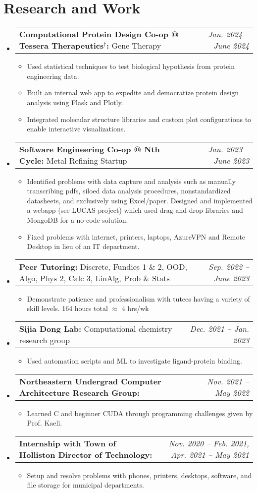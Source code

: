 \documentclass[letterpaper,11pt]{article}
\makeatletter
\newcommand{\resumeBullet}[1]{
  \item\small{
    #1 \vspace{-2pt}
  }
}
\newcommand{\resumeSubheadingThin}[3]{
  \vspace{-1pt}\item
    \begin{tabular*}{0.97\textwidth}[t]{l@{\extracolsep{\fill}}r}
      \small\textbf{#1:} #3 & \small\textit{#2} 
    \end{tabular*}\vspace{-7pt}
}
\newcommand{\resumeSubHeadingListStart}{\begin{itemize}[leftmargin=*]}
\newcommand{\resumeSubHeadingListEnd}{\end{itemize}}
\newcommand{\resumeItemListStart}{\begin{itemize}}
\newcommand{\resumeItemListEnd}{\end{itemize}\vspace{-5pt}}
\makeatother
\begin{document}
  \section{Research and Work \small{}}
  \resumeSubHeadingListStart
  \resumeSubheadingThin{Computational Protein Design Co-op @ Tessera Therapeutics$^\dag$}{Jan. 2024 -- June 2024}{Gene Therapy}
  \resumeItemListStart
  \resumeBullet{Used statistical techniques to test biological hypothesis from protein engineering data.}
  \resumeBullet{Built an internal web app to expedite and democratize protein design analysis using Flask and Plotly.}
  \resumeBullet{Integrated molecular structure libraries and custom plot configurations to enable interactive visualizations.}
  \resumeItemListEnd
  \resumeSubheadingThin{Software Engineering Co-op @ Nth Cycle}{Jan. 2023 -- June 2023}{Metal Refining Startup}
  \resumeItemListStart
  \resumeBullet{Identified problems with data capture and analysis such as manually transcribing pdfs, siloed data analysis procedures, nonstandardized datasheets, and exclusively using Excel/paper. Designed and implemented a webapp (see LUCAS project) which used drag-and-drop libraries and MongoDB for a no-code solution. }
  \resumeBullet{Fixed problems with internet, printers, laptops, AzureVPN and Remote Desktop in lieu of an IT department.}
  \resumeItemListEnd
  \resumeSubheadingThin{Peer Tutoring\normalfont{*}}{Sep. 2022 -- June 2023}{Discrete, Fundies 1 \& 2, OOD, Algo, Phys 2, Calc 3, LinAlg, Prob \& Stats}
  \resumeItemListStart
    \resumeBullet{Demonstrate patience and professionalism with tutees having a variety of skill levels. 164 hours total $\approx$ 4 hrs/wk}
  \resumeItemListEnd
  \resumeSubheadingThin{Sijia Dong Lab\normalfont{*}}{Dec. 2021 -- Jan. 2023}{Computational
  chemistry research group} \resumeItemListStart \resumeBullet{Used automation scripts and ML to investigate ligand-protein binding.}
\resumeItemListEnd
  \resumeSubheadingThin{Northeastern Undergrad Computer Architecture Research Group\normalfont{*}}{Nov. 2021 -- May 2022}{} \resumeItemListStart \resumeBullet{Learned C and beginner CUDA through programming challenges given by Prof. Kaeli.}
  \resumeItemListEnd
  \resumeSubheadingThin{Internship with Town of Holliston Director of Technology\normalfont{*}}{Nov. 2020 -- Feb. 2021, Apr. 2021 -- May 2021}{}
  \resumeItemListStart
    \resumeBullet{Setup and resolve problems with phones, printers, desktops, software, and file storage for municipal departments.}
  \resumeItemListEnd \resumeSubHeadingListEnd
\end{document}
